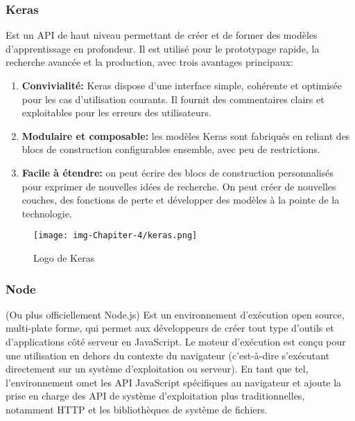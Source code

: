 \documentclass[12pt]{article}
\begin{document}

\subsubsection*{Keras}
Est un API de haut niveau permettant de créer et de former des modèles d'apprentissage en profondeur. Il est utilisé pour le prototypage rapide, la recherche avancée et la production, avec trois avantages principaux:
\begin{enumerate}
	\item \textbf{Convivialité:} Keras dispose d'une interface simple, cohérente et optimisée pour les cas d'utilisation courants. Il fournit des commentaires clairs et exploitables pour les erreurs des utilisateurs.
	\item \textbf{Modulaire et composable:} les modèles Keras sont fabriqués en reliant des blocs de construction configurables ensemble, avec peu de restrictions.
	\item \textbf{Facile à étendre:} on peut écrire des blocs de construction personnalisés pour exprimer de nouvelles idées de recherche. On peut créer de nouvelles couches, des fonctions de perte et développer des modèles à la pointe de la technologie.
\end{enumerate}

\begin{figure}[h]
	\centering
	\texttt{[image: img-Chapiter-4/keras.png]}
	\caption{Logo de Keras}
\end{figure}

\subsubsection*{Node}
(Ou plus officiellement Node.js) Est un environnement d'exécution open source, multi-plate forme, qui permet aux développeurs de créer tout type d'outils et d'applications côté serveur en JavaScript. Le moteur d’exécution est conçu pour une utilisation en dehors du contexte du navigateur (c’est-à-dire s’exécutant directement sur un système d’exploitation ou serveur). En tant que tel, l'environnement omet les API JavaScript spécifiques au navigateur et ajoute la prise en charge des API de système d'exploitation plus traditionnelles, notamment HTTP et les bibliothèques de système de fichiers.
\end{document}
